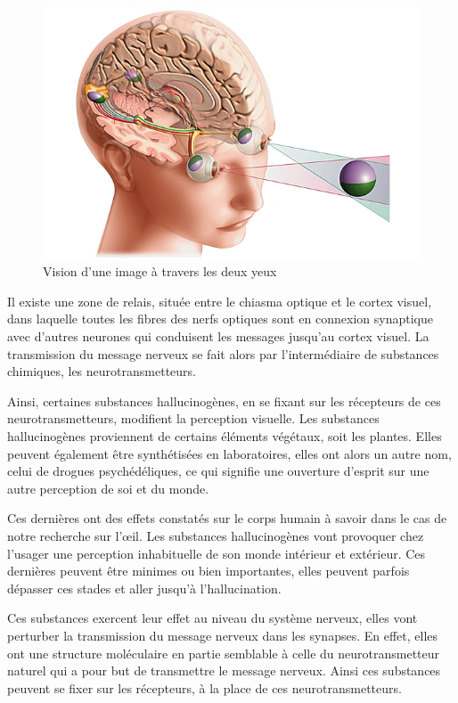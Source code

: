 \documentclass[a4paper, 12pt, onecolumn, openany]{report}
\begin{document}
	\begin{figure}[h]
	\begin{center}
	\includegraphics[scale=0.7]{deux_yeux.jpg}		
	\end{center}
	\caption{Vision d'une image à travers les deux yeux}
	\label{Vision d'une image à travers les deux yeux}
	\end{figure}
	
	Il existe une zone de relais, située entre le chiasma optique et le cortex visuel, dans laquelle toutes les fibres des nerfs optiques sont en connexion synaptique avec d'autres neurones qui conduisent les messages jusqu'au cortex visuel. La transmission du message nerveux se fait alors par l'intermédiaire de substances chimiques, les neurotransmetteurs.
	
	Ainsi, certaines substances hallucinogènes, en se fixant sur les récepteurs de ces neurotransmetteurs, modifient la perception visuelle. 
	Les substances hallucinogènes proviennent de certains éléments végétaux, soit les plantes.  Elles peuvent également être synthétisées en laboratoires, elles ont alors un autre nom, celui de drogues psychédéliques, ce qui signifie une ouverture d’esprit sur une autre perception de soi et du monde.
	
	Ces dernières ont des effets constatés sur le corps humain à savoir dans le cas de notre recherche sur l’œil. 
Les substances hallucinogènes vont provoquer chez l’usager une perception inhabituelle de son monde intérieur et extérieur. Ces dernières peuvent être minimes ou bien importantes, elles peuvent parfois dépasser ces stades et aller jusqu'à l’hallucination. 

	Ces substances exercent leur effet au niveau du système nerveux, elles vont perturber la transmission du message nerveux dans les synapses. En effet, elles ont une structure moléculaire en partie semblable à celle du neurotransmetteur naturel qui a pour but de transmettre le message nerveux. Ainsi ces substances peuvent se fixer sur les récepteurs, à la place de ces neurotransmetteurs. 
	
\end{document}
